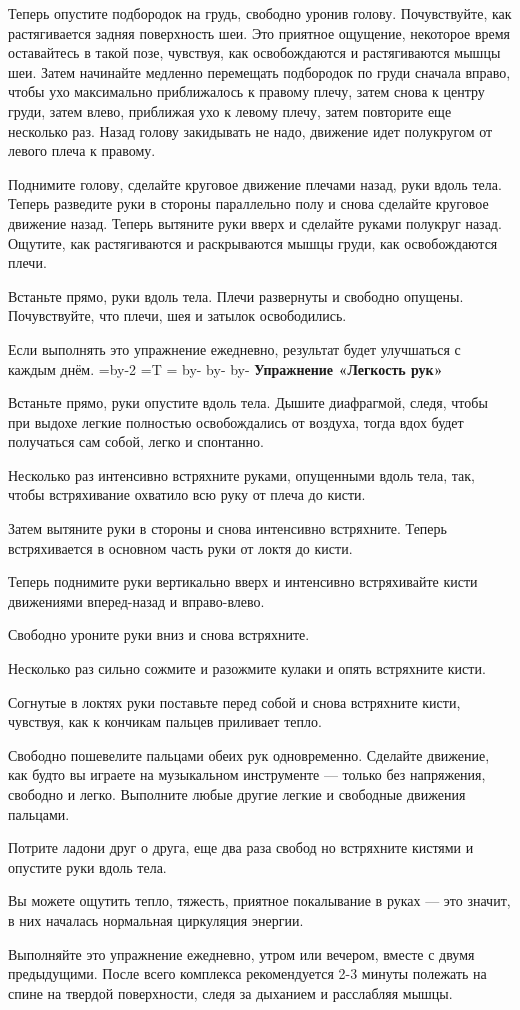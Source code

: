 Теперь опустите подбородок на грудь, свободно уронив голову. Почувствуйте, как растягивается задняя поверхность шеи. Это приятное ощущение, некоторое время оставайтесь в такой позе, чувствуя, как освобождаются и растягиваются мышцы шеи. Затем начинайте медленно перемещать подбородок по груди сначала вправо, чтобы ухо максимально приближалось к правому плечу, затем снова к центру груди, затем влево, приближая ухо к левому плечу, затем повторите еще несколько раз. Назад голову закидывать не надо, движение идет полукругом от левого плеча к правому.

Поднимите голову, сделайте круговое движение плечами назад, руки вдоль тела. Теперь разведите руки в стороны параллельно полу и снова сделайте круговое движение назад. Теперь вытяните руки вверх и сделайте руками полукруг назад. Ощутите, как растягиваются и раскрываются мышцы груди, как освобождаются плечи.

Встаньте прямо, руки вдоль тела. Плечи развернуты и свободно опущены. Почувствуйте, что плечи, шея и затылок освободились.

Если выполнять это упражнение ежедневно, результат будет улучшаться с каждым днём.
\bye
\pdfhorigin=13mm \hsize=\pdfpagewidth \advance\hsize by-2\pdfhorigin
\pdfvorigin=15mm =\hbox{T} =\topskip \advance{} by-
  \advance\pdfvorigin by-
\vsize=282mm \advance\vsize by-\pdfvorigin
\nopagenumbers
{\bf Упражнение «Легкость рук»}

Встаньте прямо, руки опустите вдоль тела. Дышите диафрагмой, следя, чтобы при выдохе легкие полностью освобождались от воздуха, тогда вдох будет получаться сам собой, легко и спонтанно.

Несколько раз интенсивно встряхните руками, опущенными вдоль тела, так, чтобы встряхивание охватило всю руку от плеча до кисти.

Затем вытяните руки в стороны и снова интенсивно встряхните. Теперь встряхивается в основном часть руки от локтя до кисти.

Теперь поднимите руки вертикально вверх и интенсивно встряхивайте кисти движениями вперед-назад и вправо-влево.

Свободно уроните руки вниз и снова встряхните.

Несколько раз сильно сожмите и разожмите кулаки и опять встряхните кисти.

Согнутые в локтях руки поставьте перед собой и снова встряхните кисти, чувствуя, как к кончикам пальцев приливает тепло.

Свободно пошевелите пальцами обеих рук одновременно. Сделайте движение, как будто вы играете на
музыкальном инструменте --- только без напряжения, свободно и легко. Выполните любые другие легкие и свободные движения пальцами.

Потрите ладони друг о друга, еще два раза свобод но встряхните кистями и опустите руки вдоль тела.

Вы можете ощутить тепло, тяжесть, приятное покалывание в руках --- это значит, в них началась
нормальная циркуляция энергии.

Выполняйте это упражнение ежедневно, утром или вечером, вместе с двумя предыдущими. После всего комплекса рекомендуется 2-3 минуты полежать на спине на твердой поверхности, следя за дыханием и расслабляя мышцы.
\bye
